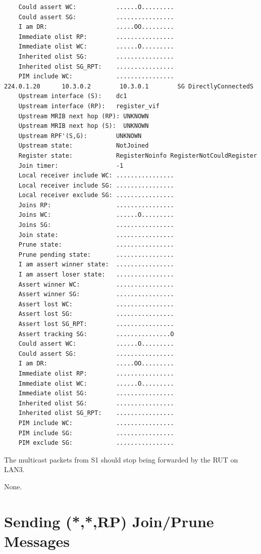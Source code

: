 \documentclass[11pt]{report}
\begin{document}
\begin{itemize}
\begin{verbatim}
    Could assert WC:           ......O.........
    Could assert SG:           ................
    I am DR:                   .....OO.........
    Immediate olist RP:        ................
    Immediate olist WC:        ......O.........
    Inherited olist SG:        ................
    Inherited olist SG_RPT:    ................
    PIM include WC:            ................
224.0.1.20      10.3.0.2        10.3.0.1        SG DirectlyConnectedS 
    Upstream interface (S):    dc1
    Upstream interface (RP):   register_vif
    Upstream MRIB next hop (RP): UNKNOWN
    Upstream MRIB next hop (S):  UNKNOWN
    Upstream RPF'(S,G):        UNKNOWN
    Upstream state:            NotJoined 
    Register state:            RegisterNoinfo RegisterNotCouldRegister 
    Join timer:                -1
    Local receiver include WC: ................
    Local receiver include SG: ................
    Local receiver exclude SG: ................
    Joins RP:                  ................
    Joins WC:                  ......O.........
    Joins SG:                  ................
    Join state:                ................
    Prune state:               ................
    Prune pending state:       ................
    I am assert winner state:  ................
    I am assert loser state:   ................
    Assert winner WC:          ................
    Assert winner SG:          ................
    Assert lost WC:            ................
    Assert lost SG:            ................
    Assert lost SG_RPT:        ................
    Assert tracking SG:        ...............O
    Could assert WC:           ......O.........
    Could assert SG:           ................
    I am DR:                   .....OO.........
    Immediate olist RP:        ................
    Immediate olist WC:        ......O.........
    Immediate olist SG:        ................
    Inherited olist SG:        ................
    Inherited olist SG_RPT:    ................
    PIM include WC:            ................
    PIM include SG:            ................
    PIM exclude SG:            ................
\end{verbatim}

  The multicast packets from S1 should stop being forwarded by the RUT on
  LAN3.

\end{itemize}

None.

\newpage
\section{Sending (*,*,RP) Join/Prune Messages}
\end{document}
